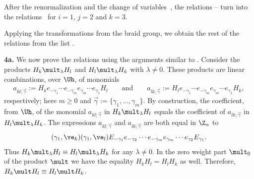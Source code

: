 \documentclass[pdftex]{sigma}
\numberwithin{equation}{section}
\begin{document}
After the renormalization  and the change of variables~, the relations -- turn into
the relations~ for $i=1$, $j=2$ and $k=3$.


Applying the transformations from the braid group, we obtain the rest of the relations from the list .

{\bf 4a.} We now prove the relations  using the arguments similar to \cite[Subsection 6.1.2]{Zh}.
 Consider the
products $H_k\mult_\lambda H_l$  and $H_l\mult_\lambda H_k$ with $\lambda\not=0$.
These products are linear combinations, over $\Uh$, of monomials
\begin{gather*}
a_{kl;\vec{\gamma}}:=H_ke_{-\gamma_1}\cdots e_{-\gamma_m}e_{\gamma_m}\cdots e_{\gamma_1}H_l\qquad\text{and}\qquad
a_{lk;\vec{\gamma}}:=H_le_{-\gamma_1}\cdots e_{-\gamma_m}e_{\gamma_m}\cdots e_{\gamma_1}H_k  ,
\end{gather*}
respectively; here $m\geq 0$ and $\vec{\gamma}:=\{\gamma_1,\dots ,\gamma_m\}$. By construction, the coef\/f\/icient, from $\Uh$, of the monomial
$a_{kl;\vec{\gamma}}$ in $H_k\mult_\lambda H_l$ equals the coef\/f\/icient of $a_{lk;\vec{\gamma}}$ in $H_l\mult_\lambda H_k$.
The expressions $a_{kl;\vec{\gamma}}$ and $a_{lk;\vec{\gamma}}$ are both equal in $\Z_n$  to
\begin{gather*}(\gamma_1,\ve_k)(\gamma_1,\ve_l)E_{-\gamma_1}e_{-\gamma_2}\cdots
e_{-\gamma_m}e_{\gamma_m}\cdots e_{\gamma_2}E_{\gamma_1}  .\end{gather*}
Thus $H_k\mult_\lambda H_l\equiv H_l\mult_\lambda H_k$  for any $\lambda\not=0$. In the zero weight part $\mult_0$
of the product $\mult$ we have the equality $H_kH_l=H_lH_k$ as well. Therefore,
$H_k\mult H_l\equiv H_l\mult H_k$.
\end{document}
